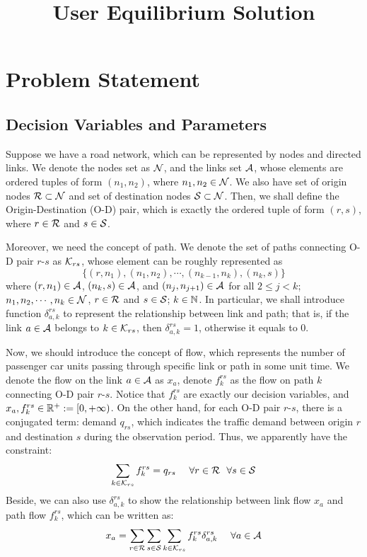 \documentclass{article}
\title{User Equilibrium Solution}
\begin{document}
\maketitle


\section{Problem Statement}

\subsection{Decision Variables and Parameters}

Suppose we have a road network, which can be represented by nodes and directed links. We denote the nodes set as $ \mathcal{N} $, and the links set $ \mathcal{A} $, whose elements are ordered tuples of form $ (n_1, n_2) $, where $ n_1, n_2 \in \mathcal{N} $. We also have set of origin nodes $ \mathcal{R} \subset \mathcal{N} $ and set of destination nodes $ \mathcal{S} \subset \mathcal{N} $. Then, we shall define the Origin-Destination (O-D) pair, which is exactly the ordered tuple of form $ (r, s) $, where $ r \in \mathcal{R} $ and $ s \in \mathcal{S} $.

Moreover, we need the concept of path. We denote the set of paths connecting O-D pair $ r $-$ s $ as $ \mathcal{K}_{rs} $, whose element can be roughly represented as
$$ \{ (r, n_1), (n_1, n_2), \cdots, (n_{k-1}, n_k), (n_k, s) \} $$ 
where $ (r, n_1) \in \mathcal{A} $, $ (n_k, s) \in \mathcal{A} $, and $ (n_j, n_{j+1}) \in \mathcal{A} $ for all $ 2 \le j < k $; $ n_1, n_2, \cdots, n_k \in \mathcal{N} $, $ r \in \mathcal{R} $ and $ s \in \mathcal{S} $; $ k \in \mathbb{N} $. In particular, we shall introduce function $ \delta_{a, k}^{rs} $ to represent the relationship between link and path; that is, if the link $ a \in \mathcal{A} $ belongs to $ k \in \mathcal{K}_{rs} $, then $ \delta_{a, k}^{rs} = 1 $, otherwise it equals to $ 0 $.

Now, we should introduce the concept of flow, which represents the number of passenger car units passing through specific link or path in some unit time. We denote the flow on the link $ a \in \mathcal{A} $ as $ x_a $, denote $ f_k^{rs} $ as the flow on path $ k $ connecting O-D pair $ r $-$ s $. Notice that $ f_k^{rs} $ are exactly our decision variables, and $ x_a, f_k^{rs} \in \mathbb{R}^+ := [0, + \infty) $. On the other hand, for each O-D pair $ r $-$ s $, there is a conjugated term: demand $ q_{rs} $, which indicates the traffic demand between origin $ r $ and destination $ s $ during the observation period. Thus, we apparently have the constraint: 
$$ \sum_{k \in \mathcal{K}_{rs}} f_{k}^{rs} = q_{rs} ~~~~ \forall r \in \mathcal{R} ~~ \forall s \in \mathcal{S} $$
Beside, we can also use $ \delta_{a, k}^{rs} $ to show the relationship between link flow $ x_a $ and path flow $ f_k^{rs} $, which can be written as: 
\begin{equation} \label{eq-path-flow-to-link-flow}
    x_a = \sum_{r \in \mathcal{R}} \sum_{s \in \mathcal{S}} \sum_{k \in \mathcal{K}_{rs}} f_{k}^{rs} \delta_{a, k}^{rs} ~~~~ \forall a \in \mathcal{A}
\end{equation}
\end{document}
